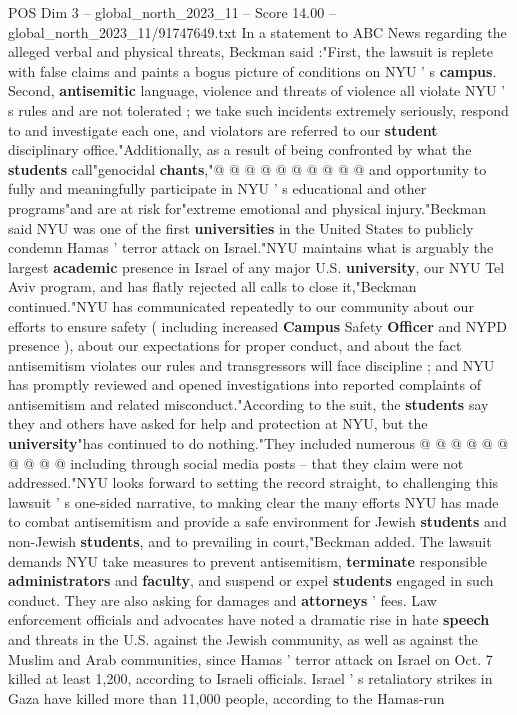 \begin{textsample}{POS Dim 3 – global\_north\_2023\_11 – Score 14.00 – global\_north\_2023\_11/91747649.txt}
In a statement to ABC News regarding the alleged verbal and physical threats, Beckman said :"First, the lawsuit is replete with false claims and paints a bogus picture of conditions on NYU ' s \textbf{campus}.
Second, \textbf{antisemitic} language, violence and threats of violence all violate NYU ' s rules and are not tolerated ; we take such incidents extremely seriously, respond to and investigate each one, and violators are referred to our \textbf{student} disciplinary office."Additionally, as a result of being confronted by what the \textbf{students} call"genocidal \textbf{chants},"@ @ @ @ @ @ @ @ @ @ and opportunity to fully and meaningfully participate in NYU ' s educational and other programs"and are at risk for"extreme emotional and physical injury."Beckman said NYU was one of the first \textbf{universities} in the United States to publicly condemn Hamas ' terror attack on Israel."NYU maintains what is arguably the largest \textbf{academic} presence in Israel of any major U.S. \textbf{university}, our NYU Tel Aviv program, and has flatly rejected all calls to close it,"Beckman continued."NYU has communicated repeatedly to our community about our efforts to ensure safety ( including increased \textbf{Campus} Safety \textbf{Officer} and NYPD presence ), about our expectations for proper conduct, and about the fact antisemitism violates our rules and transgressors will face discipline ; and NYU has promptly reviewed and opened investigations into reported complaints of antisemitism and related misconduct."According to the suit, the \textbf{students} say they and others have asked for help and protection at NYU, but the \textbf{university}"has continued to do nothing."They included numerous @ @ @ @ @ @ @ @ @ @ including through social media posts -- that they claim were not addressed."NYU looks forward to setting the record straight, to challenging this lawsuit ' s one-sided narrative, to making clear the many efforts NYU has made to combat antisemitism and provide a safe environment for Jewish \textbf{students} and non-Jewish \textbf{students}, and to prevailing in court,"Beckman added.
The lawsuit demands NYU take measures to prevent antisemitism, \textbf{terminate} responsible \textbf{administrators} and \textbf{faculty}, and suspend or expel \textbf{students} engaged in such conduct.
They are also asking for damages and \textbf{attorneys} ' fees.
Law enforcement officials and advocates have noted a dramatic rise in hate \textbf{speech} and threats in the U.S. against the Jewish community, as well as against the Muslim and Arab communities, since Hamas ' terror attack on Israel on Oct. 7 killed at least 1,200, according to Israeli officials.
Israel ' s retaliatory strikes in Gaza have killed more than 11,000 people, according to the Hamas-run

\end{textsample}
